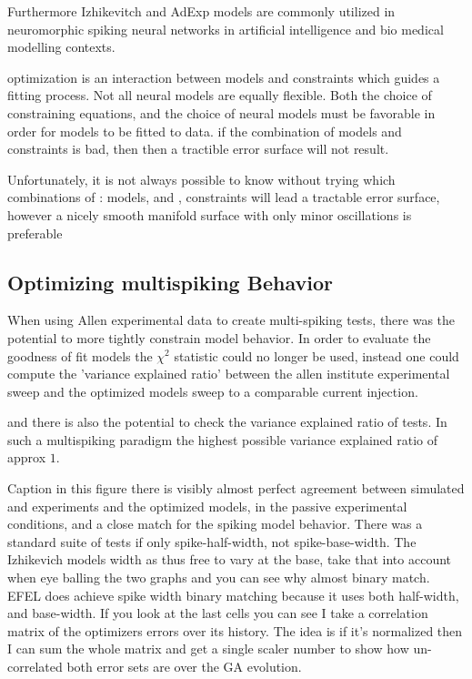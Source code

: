 Furthermore Izhikevitch and AdExp models are commonly utilized in neuromorphic spiking neural networks in artificial intelligence and bio medical modelling contexts.

optimization is an interaction between models and constraints which guides a fitting process. Not all neural models are equally flexible.  
Both the choice of constraining equations, and the choice of neural models must be favorable in order for models to be fitted to data.
if the combination of models and constraints is bad, then then a tractible error surface will not result.  

Unfortunately, it is not always possible to know without trying which combinations of \subitem[A]: models, and \subitem[B], constraints will lead a tractable error surface, however a nicely smooth manifold surface with only minor oscillations is preferable


\subsection{Optimizing multispiking Behavior}

When using Allen experimental data to create multi-spiking tests, there was the potential to more tightly constrain model behavior. In order to evaluate the goodness of fit models the $\chi^{2}$ statistic could no longer be used, instead one could compute the 'variance explained ratio' between the allen institute experimental sweep and the optimized models sweep to a comparable current injection.

and there is also the potential to check the variance explained ratio of tests.
In such a multispiking paradigm the highest possible variance explained ratio of approx $1$. 

Caption in this figure there is visibly almost perfect  agreement between simulated and experiments and the optimized models, in the passive experimental conditions, and a close match for the spiking model behavior. There was a standard suite of tests if only spike-half-width, not spike-base-width. The Izhikevich models width as thus free to vary at the base, take that into account when eye balling the two graphs and you can see why almost binary match. EFEL does achieve spike width binary matching because it uses both half-width, and base-width. If you look at the last cells you can see I take a correlation matrix of the optimizers errors over its history. The idea is if it's normalized then I can sum the whole matrix and get a single scaler number to show how un-correlated both error sets are over the GA evolution. 

